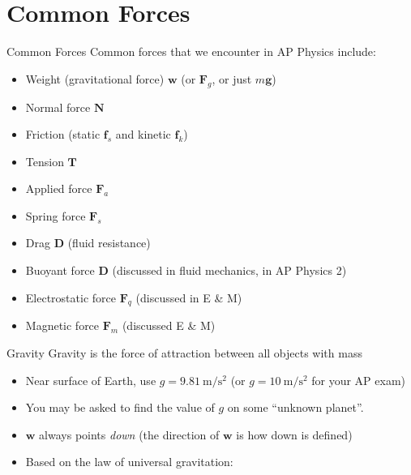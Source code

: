 \documentclass[12pt,compress,aspectratio=169]{beamer}
\begin{document}
\section{Common Forces}

\begin{frame}{Common Forces}
  Common forces that we encounter in AP Physics include:
  \begin{itemize}
  \item Weight (gravitational force) $\bm w$ (or $\bm F_g$, or just $m\bm g$)
  \item Normal force $\bm N$
  \item Friction (static $\bm f_s$ and kinetic $\bm f_k$)
  \item Tension $\bm T$
  \item Applied force $\bm F_a$
  \item Spring force $\bm F_s$
  \item Drag $\bm D$ (fluid resistance)
  \item Buoyant force $\bm D$ (discussed in fluid mechanics, in AP Physics 2)
  \item Electrostatic force $\bm F_q$ (discussed in E \& M)
  \item Magnetic force $\bm F_m$ (discussed E \& M)
  \end{itemize}
\end{frame}



\begin{frame}{Gravity}
  Gravity is the force of attraction between all objects with mass
    
  \begin{itemize}
  \item\vspace{-.15in}Near surface of Earth, use
    $g=\SI{9.81}{\metre\per\second\squared}$ (or
    $g=\SI{10}{\metre\per\second\squared}$ for your AP exam)
  \item You may be asked to find the value of $g$ on some ``unknown planet''.
  \item $\bm w$ always points \emph{down} (the direction of $\bm w$ is how
    down is defined)
  \item Based on the law of universal gravitation:

  \end{itemize}    
\end{frame}
\end{document}
